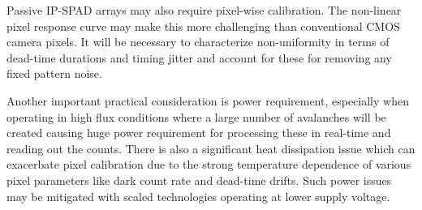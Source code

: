Passive IP-SPAD arrays may also require pixel-wise calibration. The non-linear
pixel response curve may make this more challenging than conventional CMOS
camera pixels. It will be necessary to characterize non-uniformity in terms of
dead-time durations and timing jitter and account for these for removing any
fixed pattern noise.

Another important practical consideration is power requirement, especially when
operating in high flux conditions where a large number of avalanches will be
created causing huge power requirement for processing these in real-time and
reading out the counts. There is also a significant heat dissipation issue
which can exacerbate pixel calibration due to the strong temperature dependence
of various pixel parameters like dark count rate and dead-time drifts. Such
power issues may be mitigated with scaled technologies operating at lower
supply voltage.

